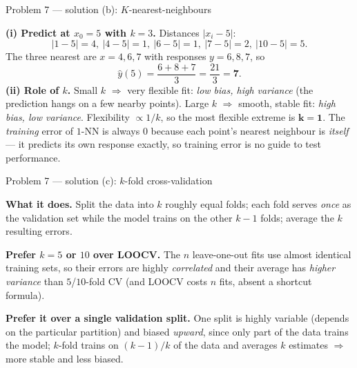 \documentclass[aspectratio=169,11pt]{beamer}
\begin{document}
\begin{frame}{Problem 7 --- solution (b): $K$-nearest-neighbours}
  \begin{solutionbox}
    \textbf{(i) Predict at $x_0=5$ with $k=3$.} Distances $|x_i-5|$:
    \[
      |1-5|=4,\ |4-5|=1,\ |6-5|=1,\ |7-5|=2,\ |10-5|=5.
    \]
    The three nearest are $x=4,6,7$ with responses $y=6,8,7$, so
    \[
      \hat y(5)=\frac{6+8+7}{3}=\frac{21}{3}=\mathbf{7}.
    \]
    \textbf{(ii) Role of $k$.} Small $k$ $\Rightarrow$ very flexible fit: \emph{low bias, high
    variance} (the prediction hangs on a few nearby points). Large $k$ $\Rightarrow$ smooth, stable
    fit: \emph{high bias, low variance}. Flexibility $\propto 1/k$, so the most flexible extreme is
    $\mathbf{k=1}$. The \emph{training} error of $1$-NN is always $0$ because each point's nearest
    neighbour is \emph{itself} --- it predicts its own response exactly, so training error is no
    guide to test performance.
  \end{solutionbox}
\end{frame}

\begin{frame}{Problem 7 --- solution (c): $k$-fold cross-validation}
  \begin{solutionbox}
    \textbf{What it does.} Split the data into $k$ roughly equal folds; each fold serves \emph{once}
    as the validation set while the model trains on the other $k-1$ folds; average the $k$ resulting
    errors.
    \medskip

    \textbf{Prefer $k=5$ or $10$ over LOOCV.} The $n$ leave-one-out fits use almost identical
    training sets, so their errors are highly \emph{correlated} and their average has \emph{higher
    variance} than $5$/$10$-fold CV (and LOOCV costs $n$ fits, absent a shortcut formula).
    \medskip

    \textbf{Prefer it over a single validation split.} One split is highly variable (depends on the
    particular partition) and biased \emph{upward}, since only part of the data trains the model;
    $k$-fold trains on $(k-1)/k$ of the data and averages $k$ estimates $\Rightarrow$ more stable and
    less biased.
  \end{solutionbox}
\end{frame}
\end{document}
